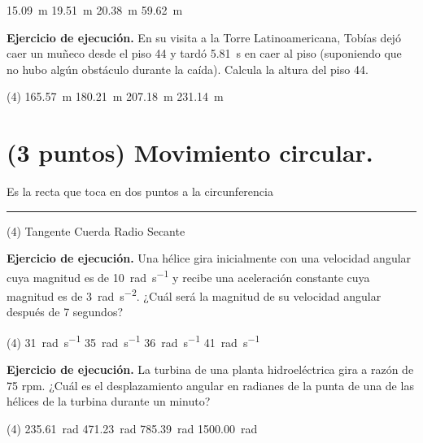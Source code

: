 \documentclass[12pt, letter]{exam}
\begin{document}
\begin{questions}
\begin{tasks}
        \task \SI{15.09}{\meter}
        \task \SI{19.51}{\meter}
        \task \SI{20.38}{\meter}
        \task \SI{59.62}{\meter}
    \end{tasks}
    \question \label{Ejercicio_06} \textbf{Ejercicio de ejecución. } En su visita a la Torre Latinoamericana, Tobías dejó caer un muñeco desde el piso \num{44} y tardó \SI{5.81}{\second} en caer al piso (suponiendo que no hubo algún obstáculo durante la caída). Calcula la altura del piso \num{44}.
    \begin{tasks}(4)
        \task \SI{165.57}{\meter}
        \task \SI{180.21}{\meter}
        \task \SI{207.18}{\meter}
        \task \SI{231.14}{\meter}
    \end{tasks}
    

    \section{(3 puntos) Movimiento circular.}

    \question Es la recta que toca en dos puntos a la circunferencia \rule{2cm}{0.1mm}
    \begin{tasks}(4)
        \task Tangente
        \task Cuerda
        \task Radio
        \task Secante
    \end{tasks}
    \question \label{Ejercicio_07} \textbf{Ejercicio de ejecución. } Una hélice gira inicialmente con una velocidad angular cuya magnitud es de \SI{10}{\radian\per\second} y recibe una aceleración constante cuya magnitud es de \SI{3}{\radian\per\square\second}. ¿Cuál será la magnitud de su velocidad angular después de \num{7} segundos?
    \begin{tasks}(4)
        \task \SI{31}{\radian\per\second}
        \task \SI{35}{\radian\per\second}
        \task \SI{36}{\radian\per\second}
        \task \SI{41}{\radian\per\second}
    \end{tasks}
    \question \label{Ejercicio_08} \textbf{Ejercicio de ejecución. } La turbina de una planta hidroeléctrica gira a razón de 75 rpm. ¿Cuál es el desplazamiento angular en radianes de la punta de una de las hélices de la turbina durante un minuto?
    \begin{tasks}(4)
        \task \SI{235.61}{\radian}
        \task \SI{471.23}{\radian}
        \task \SI{785.39}{\radian}
        \task \SI{1500.00}{\radian}
    \end{tasks}


\end{questions}
\end{document}
